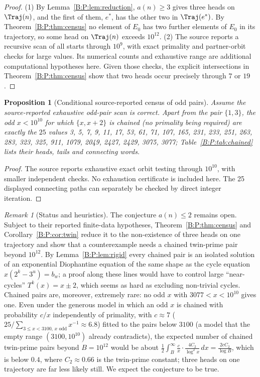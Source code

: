 \documentclass[11pt,a4paper]{article}
\newtheorem{proposition}[theorem]{Proposition}
\theoremstyle{definition}
\theoremstyle{remark}
\newtheorem{remark}[theorem]{Remark}
\numberwithin{equation}{section}
\begin{document}
\begin{proof}
(1) By Lemma~\ref{B:P:lem:reduction}, $a(n)\ge3$ gives three heads on $\Traj(n)$,
and the first of them, $e^*$, has the other two in $\Traj(e^*)$. By
Theorem~\ref{B:P:thm:census} no element of $E_0$ has two further elements of
$E_0$ in its trajectory, so some head on $\Traj(n)$ exceeds $10^{12}$.
(2) The source reports a recursive scan of all starts through $10^9$,
with exact primality and partner-orbit checks for large values. Its numerical
counts and exhaustive range are additional computational hypotheses here.
Given those checks, the explicit intersections in Theorem~\ref{B:P:thm:census}
show that two heads occur precisely through $7$ or $19$.
\end{proof}

\begin{proposition}[Conditional source-reported census of odd pairs]\label{B:P:prop:allchained}
Assume the source-reported exhaustive odd-pair scan is correct. Apart from
the pair $\{1,3\}$, the odd $x<10^{10}$ for which $\{x,x+2\}$ is chained (no primality being required) are exactly the $25$ values 3, 5, 7, 9, 11, 17, 53, 61, 71, 107, 165, 231, 233, 251, 263, 283, 323, 325, 911, 1079, 2049, 2427, 2429, 3075, 3077; Table~\ref{B:P:tab:chained} lists their heads, tails and connecting words.
\end{proposition}

\begin{proof}
The source reports exhaustive exact orbit testing through $10^{10}$,
with smaller independent checks. No exhaustion certificate is included here.
The 25 displayed connecting paths can separately be checked by direct integer iteration.
\end{proof}

\begin{remark}[Status and heuristics]\label{B:P:rem:twinstatus}
The conjecture $a(n)\le2$ remains open. Subject to their reported finite-data hypotheses, Theorem~\ref{B:P:thm:census}
and Corollary~\ref{B:P:cor:twin} reduce it to the non-existence of three heads on one
trajectory and show that a counterexample needs a chained twin-prime pair beyond
$10^{12}$. By Lemma~\ref{B:P:lem:rigid} every chained pair is an isolated solution
of an exponential Diophantine equation of the same shape as the cycle equation
$x(2^k-3^u)=b_w$; a proof along these lines would have to control large ``near-cycles''
$T^k(x)=x\pm2$, which seems as hard as excluding non-trivial cycles. Chained
pairs are, moreover, extremely rare: no odd $x$ with $3077<x<10^{10}$ gives one.
Even under the generous model in which an odd $x$ is chained with probability
$c/x$ independently of primality, with $c\approx7$ ($25/\sum_{3\le x<3100,\,x\text{ odd}}x^{-1}\approx6.8$) fitted to the pairs below
$3100$ (a model that the empty range $(3100,10^{10})$ already contradicts), the
expected number of chained twin-prime pairs beyond $B=10^{12}$ would be about
$\tfrac12\int_B^\infty\tfrac cx\cdot\tfrac{4C_2}{\log^2x}\,dx=\tfrac{2cC_2}{\log B}$,
which is below $0.4$, where $C_2\approx0.66$ is the twin-prime constant; three
heads on one trajectory are far less likely still. We expect the conjecture to
be true.
\end{remark}
\end{document}

